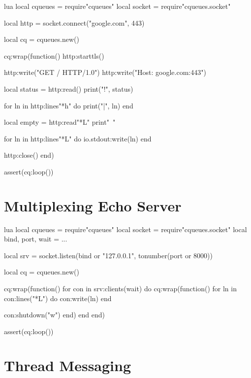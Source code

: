 \documentclass[11pt, oneside]{memoir}
\begin{document}
\begin{example}{lua}
local cqueues = require"cqueues"
local socket = require"cqueues.socket"

local http = socket.connect("google.com", 443)

local cq = cqueues.new()

cq:wrap(function()
	http:starttls()

	http:write("GET / HTTP/1.0\n")
	http:write("Host: google.com:443\n\n")

	local status = http:read()
	print("!", status)

	for ln in http:lines"*h" do
		print("|", ln)
	end

	local empty = http:read"*L"
	print"~"

	for ln in http:lines"*L" do
		io.stdout:write(ln)
	end

	http:close()
end)

assert(cq:loop())
\end{example}


\clearpage
\section{Multiplexing Echo Server}

\begin{example}{lua}
local cqueues = require"cqueues"
local socket = require"cqueues.socket"
local bind, port, wait = ...

local srv = socket.listen(bind or "127.0.0.1", tonumber(port or 8000))

local cq = cqueues.new()

cq:wrap(function()
	for con in srv:clients(wait) do
		cq:wrap(function()
			for ln in con:lines("*L") do
				con:write(ln)
			end

			con:shutdown("w")
		end)
	end
end)

assert(cq:loop())
\end{example}

\clearpage
\section{Thread Messaging}
\end{document}
